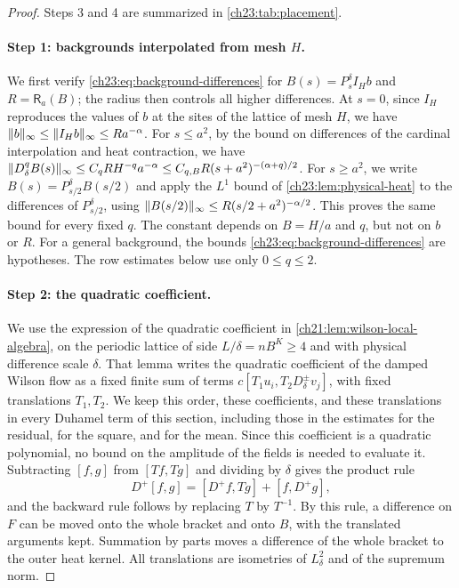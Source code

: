 \begin{proof}
Steps 3 and 4 are summarized in \cref{ch23:tab:placement}.

\paragraph{Step 1: backgrounds interpolated from mesh $H$.}
We first verify \eqref{ch23:eq:background-differences} for $B(s)=P_s^\delta I_Hb$ and $R=\mathsf R_a(B)$; the radius then controls all higher differences. At $s=0$, since $I_H$ reproduces the values of $b$ at the sites of the lattice of mesh $H$, we have $\lVert b\rVert_\infty\le\lVert I_Hb\rVert_\infty\le Ra^{-\alpha}$. For $s\le a^2$, by the bound on differences of the cardinal interpolation and heat contraction, we have $\lVert D_\delta^qB(s)\rVert_\infty\le C_qRH^{-q}a^{-\alpha}\le C_{q,B}R(s+a^2)^{-(\alpha+q)/2}$. For $s\ge a^2$, we write $B(s)=P_{s/2}^\delta B(s/2)$ and apply the $L^1$ bound of \cref{ch23:lem:physical-heat} to the differences of $P_{s/2}^\delta$, using $\lVert B(s/2)\rVert_\infty\le R(s/2+a^2)^{-\alpha/2}$. This proves the same bound for every fixed $q$. The constant depends on $B=H/a$ and $q$, but not on $b$ or $R$. For a general background, the bounds \eqref{ch23:eq:background-differences} are hypotheses. The row estimates below use only $0\le q\le2$.

\paragraph{Step 2: the quadratic coefficient.}
We use the expression of the quadratic coefficient in \cref{ch21:lem:wilson-local-algebra}, on the periodic lattice of side $L/\delta=nB^K\ge4$ and with physical difference scale $\delta$. That lemma writes the quadratic coefficient of the damped Wilson flow as a fixed finite sum of terms $c[T_1u_i,T_2D_\delta^\pm v_j]$, with fixed translations $T_1,T_2$. We keep this order, these coefficients, and these translations in every Duhamel term of this section, including those in the estimates for the residual, for the square, and for the mean. Since this coefficient is a quadratic polynomial, no bound on the amplitude of the fields is needed to evaluate it. Subtracting $[f,g]$ from $[Tf,Tg]$ and dividing by $\delta$ gives the product rule
\[
 D^+[f,g]=[D^+f,Tg]+[f,D^+g],
\]
and the backward rule follows by replacing $T$ by $T^{-1}$. By this rule, a difference on $F$ can be moved onto the whole bracket and onto $B$, with the translated arguments kept. Summation by parts moves a difference of the whole bracket to the outer heat kernel. All translations are isometries of $L^2_\delta$ and of the supremum norm.


\end{proof}
